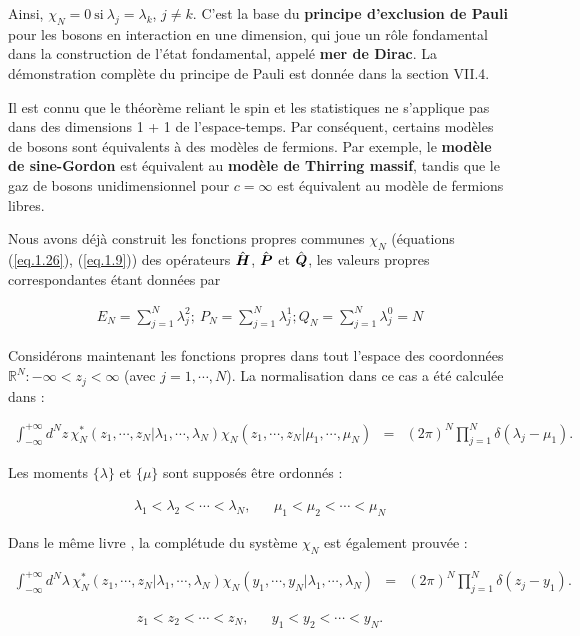 Ainsi, $\chi_N = 0 \ \text{si} \ \lambda_j = \lambda_k$, $j \neq k$. C’est la base du \textbf{principe d'exclusion de Pauli} pour les bosons en interaction en une dimension, qui joue un rôle fondamental dans la construction de l'état fondamental, appelé \textbf{mer de Dirac}. La démonstration complète du principe de Pauli est donnée dans la section VII.4.

Il est connu que le théorème reliant le spin et les statistiques ne s'applique pas dans des dimensions 1 + 1 de l'espace-temps. Par conséquent, certains modèles de bosons sont équivalents à des modèles de fermions. Par exemple, le \textbf{modèle de sine-Gordon} est équivalent au \textbf{modèle de Thirring massif}, tandis que le gaz de bosons unidimensionnel pour $c = \infty$ est équivalent au modèle de fermions libres.

Nous avons déjà construit les fonctions propres communes $\chi_N$ (équations (\ref{eq.1.26}), (\ref{eq.1.9})) des opérateurs $\hat{\bm{H}}$, $\hat{\bm{P}}$ et $\hat{\bm{Q}}$, les valeurs propres correspondantes étant données par

\begin{eqnarray}
	E_N = \sum_{j = 1 }^N \lambda_j^2 ; ~ 	P_N = \sum_{j = 1 }^N \lambda_j^1 ; Q_N = \sum_{j = 1 }^N \lambda_j^0 = N 
\end{eqnarray}

Considérons maintenant les fonctions propres dans tout l'espace des coordonnées $\mathbb{R}^N : -\infty < z_j < \infty$ (avec $j = 1, \cdots, N$). La normalisation dans ce cas a été calculée dans \cite{g} :

\begin{eqnarray}
	\int_{-\infty}^{+\infty} d^N z \, \chi_N^\ast ( z_1 , \cdots , z_N \vert \lambda_1 , \cdots , \lambda_N ) \chi_N ( z_1 , \cdots , z_N \vert \mu_1 , \cdots , \mu_N ) & = & ( 2 \pi )^N 	\prod_{ j = 1 }^N \delta ( \lambda_j - \mu _1 ).
\end{eqnarray}

Les moments \(\{ \lambda \}\) et \(\{\mu\}\) sont supposés être ordonnés :

\begin{eqnarray}
	\lambda_1 < \lambda_2 < \cdots < \lambda_N , && 		\mu_1 < \mu_2 < \cdots < \mu_N 
\end{eqnarray}

Dans le même livre \cite{9}, la complétude du système \(\chi_N\) est également prouvée :

\begin{eqnarray}
	\int_{-\infty}^{+\infty} d^N \lambda \, \chi_N^\ast ( z_1 , \cdots , z_N \vert \lambda_1 , \cdots , \lambda_N ) \chi_N ( y_1 , \cdots , y_N \vert \lambda_1 , \cdots , \lambda_N ) & = & ( 2 \pi )^N 	\prod_{ j = 1 }^N \delta ( z_j - y_1 ).
\end{eqnarray}

\begin{eqnarray}
	z_1 < z_2 < \cdots < z_N , && 		y_1 < y_2 < \cdots < y_N .
\end{eqnarray}

